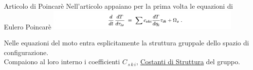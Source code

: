 \documentclass{beamer}
\begin{document}
\begin{frame}{Articolo di Poincarè}
Nell'articolo appaiano per la prima volta le equazioni di Eulero Poincarè 
\includegraphics[height=1cm]{Articolo/EP}

\vfill

Nelle equazioni del moto entra esplicitamente la struttura gruppale dello spazio di configurazione.
\\ Compaiono al loro interno i coefficienti $C_{\, s\, k \, i} $, \underline{Costanti di Struttura} del gruppo.



\end{frame}
\end{document}
